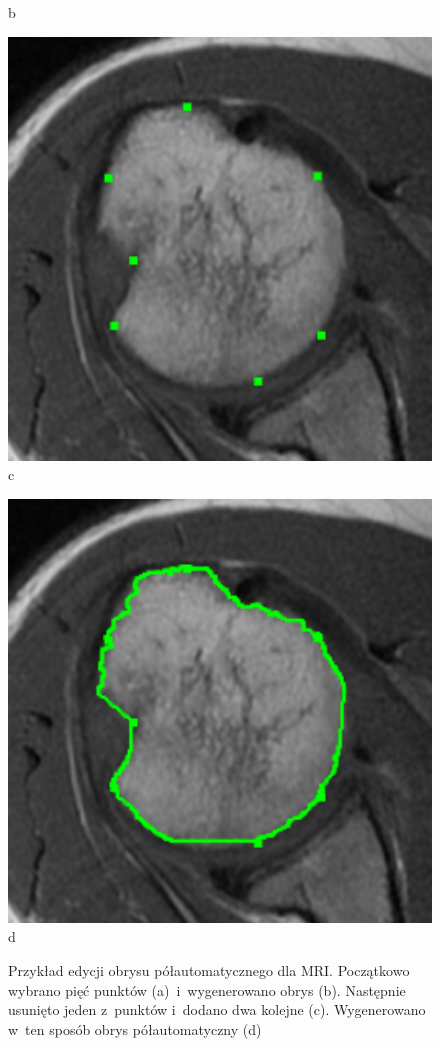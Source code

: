\documentclass[a4paper,11pt,twoside,openright]{report}
\theoremstyle{definition}
\begin{document}
\begin{figure}[h!]
\begin{center}
\begin{center}
		b
	\end{center}
	\endminipage\hfill
	\begin{center}
		\includegraphics[width=1.0\textwidth]{148}
		c
	\end{center}
	\endminipage\hfill
	\begin{center}
		\includegraphics[width=1.0\textwidth]{149}
		d
	\end{center}
	\endminipage\hfill
	\caption{Przykład edycji obrysu półautomatycznego dla MRI. Początkowo wybrano pięć punktów
	(a)~i~wygenerowano obrys (b). Następnie usunięto jeden z~punktów i~dodano dwa kolejne (c).
	Wygenerowano w~ten sposób obrys półautomatyczny (d)}
	\label{fig:146}
\end{center}
\end{figure}
\end{document}
